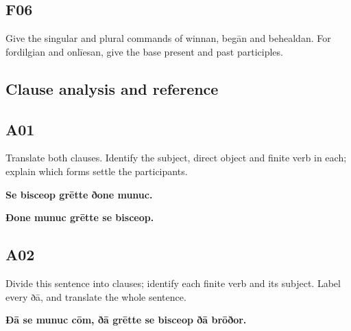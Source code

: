 \par\begin{minipage}{\linewidth}\raggedright
\subsection*{F06}

Give the singular and plural commands of winnan, begān and behealdan. For fordilgian and onlīesan, give the base present and past participles.

\end{minipage}\par\addvspace{4pt}

\subsection*{Clause analysis and reference}

\par\begin{minipage}{\linewidth}\raggedright
\subsection*{A01}

Translate both clauses. Identify the subject, direct object and finite verb in each; explain which forms settle the participants.

\textbf{Se bisceop grētte ðone munuc.}

\textbf{Ðone munuc grētte se bisceop.}

\end{minipage}\par\addvspace{4pt}

\par\begin{minipage}{\linewidth}\raggedright
\subsection*{A02}

Divide this sentence into clauses; identify each finite verb and its subject. Label every ðā, and translate the whole sentence.

\textbf{Ðā se munuc cōm, ðā grētte se bisceop ðā brōðor.}

\end{minipage}\par\addvspace{4pt}

